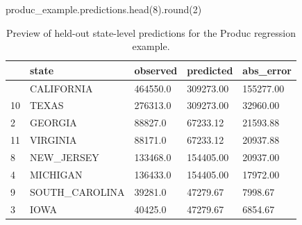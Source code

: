 \documentclass[
  letterpaper,
  DIV=11,
  numbers=noendperiod]{scrartcl}
\newenvironment{Shaded}{\begin{snugshade}}{\end{snugshade}}
\newcommand{\BuiltInTok}[1]{\textcolor[rgb]{0.00,0.23,0.31}{#1}}
\newcommand{\DecValTok}[1]{\textcolor[rgb]{0.68,0.00,0.00}{#1}}
\newcommand{\NormalTok}[1]{\textcolor[rgb]{0.00,0.23,0.31}{#1}}
\begin{document}
\begin{Shaded}
\begin{Highlighting}[]
\NormalTok{produc\_example.predictions.head(}\DecValTok{8}\NormalTok{).}\BuiltInTok{round}\NormalTok{(}\DecValTok{2}\NormalTok{)}
\end{Highlighting}
\end{Shaded}

\begin{longtable}[]{@{}lllll@{}}

\caption{\label{tbl-produc-predictions}Preview of held-out state-level
predictions for the Produc regression example.}

\tabularnewline

\toprule\noalign{}
& state & observed & predicted & abs\_error \\
\midrule\noalign{}
\endhead
\bottomrule\noalign{}
\endlastfoot
0 & CALIFORNIA & 464550.0 & 309273.00 & 155277.00 \\
10 & TEXAS & 276313.0 & 309273.00 & 32960.00 \\
2 & GEORGIA & 88827.0 & 67233.12 & 21593.88 \\
11 & VIRGINIA & 88171.0 & 67233.12 & 20937.88 \\
8 & NEW\_JERSEY & 133468.0 & 154405.00 & 20937.00 \\
4 & MICHIGAN & 136433.0 & 154405.00 & 17972.00 \\
9 & SOUTH\_CAROLINA & 39281.0 & 47279.67 & 7998.67 \\
3 & IOWA & 40425.0 & 47279.67 & 6854.67 \\

\end{longtable}
\end{document}
